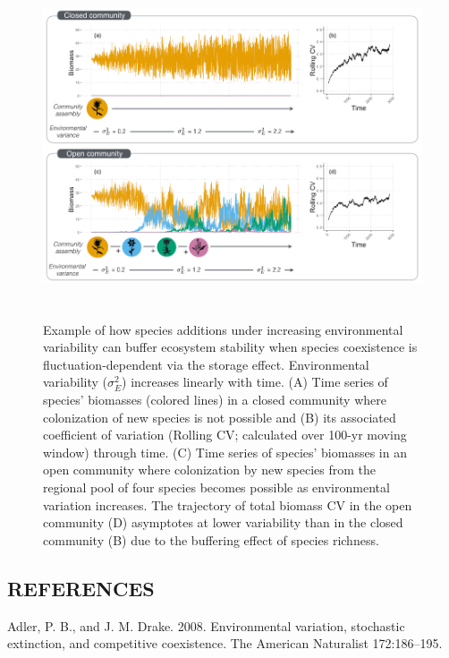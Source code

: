 \documentclass[12pt,]{article}
\begin{document}
\begin{figure}[!ht]
  \centering
      \includegraphics[height=4in]{./components/coexistence_stability_infographic_v2.png}
  \caption{Example of how species additions under increasing environmental variability can buffer ecosystem stability when species coexistence is fluctuation-dependent via the storage effect. Environmental variability ($\sigma^2_E$) increases linearly with time. (A) Time series of species' biomasses (colored lines) in a closed community where colonization of new species is not possible and (B) its associated coefficient of variation (Rolling CV; calculated over 100-yr moving window) through time. (C) Time series of species' biomasses in an open community where colonization by new species from the regional pool of four species becomes possible as environmental variation increases. The trajectory of total biomass CV in the open community (D) asymptotes at lower variability than in the closed community (B) due to the buffering effect of species richness.}
\end{figure}

\newpage{}

\setlength{\parindent}{0ex} \singlespacing

\subsection*{REFERENCES}\label{references}

Adler, P. B., and J. M. Drake. 2008. Environmental variation, stochastic
extinction, and competitive coexistence. The American Naturalist
172:186--195.
\end{document}

